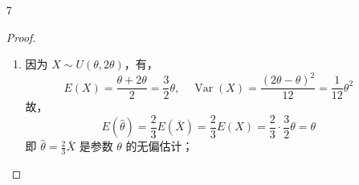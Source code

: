 \documentclass[normal,founder,mtpro2,cn]{elegantnote}
\begin{document}
\begin{enumerate}
\begin{proof}
            样本 $x_{1},x_{2},\ldots,x_{n}$ 的似然函数为
            \begin{equation*}
                L(p)=\prod_{i=1}^{n}\frac{(2-2p)^{2-x_{i}}p^{x_{i}-1}}{2-p}=\frac{(2-2p)^{2n-\sum_{i=1}^{n}x_{i}}p^{\sum_{i=1}^{n}x_{i}-n}}{(2-p)^{n}}
            \end{equation*}
            其对数似然函数为
            \begin{equation*}
                \ln L(p)=\left(2 n-\sum_{i=1}^{n} x_{i}\right) \cdot \ln (2-2 p)+\left(\sum_{i=1}^{n} x_{i}-n\right) \cdot \ln p-n \ln (2-p)
            \end{equation*}

            令
            \begin{equation*}
                \frac{\partial\ln L(p)}{\partial p}=\left(2 n-\sum_{i=1}^{n} x_{i}\right) \cdot \frac{-2}{2-2 p}+\left(\sum_{i=1}^{n} x_{i}-n\right) \cdot \frac{1}{p}-n \cdot \frac{-1}{2-p}=0
            \end{equation*}
            解得
            \begin{equation*}
                p=2-\frac{2n}{\sum_{i=1}^{n}x_{i}}=2-\frac{2}{\bar{x}}
            \end{equation*}

            故 $p$ 的最大似然估计为 $\hat{p}=2-\frac{2}{\bar{X}}$。
        \end{proof}
    \item[7]
        \begin{proof}
            \begin{enumerate}
                \item
                      因为 $X\sim U(\theta,2\theta)$，有，
                      \begin{equation*}
                          E(X)=\frac{\theta+2\theta}{2}=\frac{3}{2}\theta,\quad\operatorname{Var}(X)=\frac{(2\theta-\theta)^{2}}{12}=\frac{1}{12}\theta^{2}
                      \end{equation*}
                      故，
                      \begin{equation*}
                          E(\hat{\theta})=\frac{2}{3}E(\bar{X})=\frac{2}{3}E(X)=\frac{2}{3}\cdot\frac{3}{2}\theta=\theta
                      \end{equation*}
                      即 $\hat{\theta}=\frac{2}{3}\bar{X}$ 是参数 $\theta$ 的无偏估计；


\end{enumerate}
\end{proof}
\end{enumerate}
\end{document}
